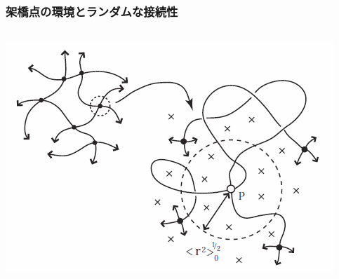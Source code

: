 \documentclass[12pt, dvipdfmx]{beamer}
\begin{document}
\begin{frame}
	\frametitle{架橋点の環境とランダムな接続性\cite{flory}}
	\begin{columns}[totalwidth=\textwidth]
		\centering
			\includegraphics[width=.8\textwidth]{JP_vicinity.png}


\end{columns}
\end{frame}
\end{document}
